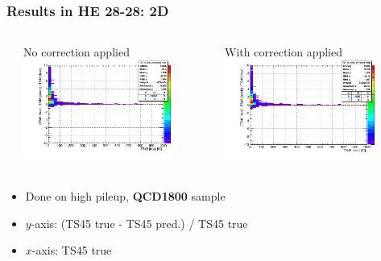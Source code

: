 \documentclass[bigger]{beamer}
\providecommand{\alert}[1]{\textbf{#1}}
\begin{document}
\begin{frame}
\frametitle{Results in HE 28-28: 2D}
\label{sec-3-3-22}
\begin{columns} %
\label{sec-3-3-22-1}
\begin{column}{0.55\textwidth}
\label{sec-3-3-22-1-1}

\centering
No correction applied
\includegraphics[width=0.8\textwidth]{fig/delta_uncorrected_QCD1800_ring_5.png}
\end{column}
\begin{column}{0.55\textwidth}
\label{sec-3-3-22-1-2}

\centering
With correction applied
\includegraphics[width=0.8\textwidth]{fig/delta_corrected_QCD1800_ring_5.png}
\end{column}
\end{columns}
\label{sec-3-3-22-2}
\begin{itemize}

\item Done on high pileup, \alert{QCD1800} sample
\label{sec-3-3-22-2-1}%

\item $y$-axis: (TS45 true - TS45 pred.) / TS45 true
\label{sec-3-3-22-2-2}%

\item $x$-axis: TS45 true
\label{sec-3-3-22-2-3}%

\end{itemize} %
\end{frame}
\end{document}
